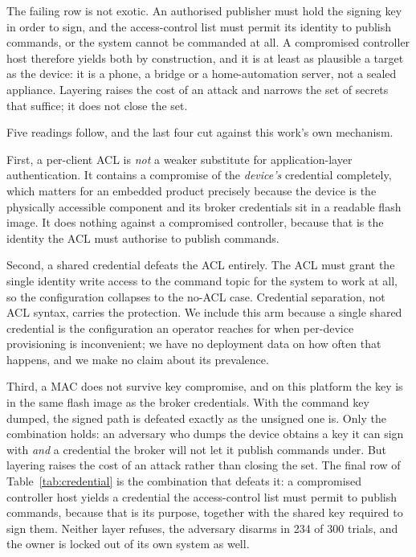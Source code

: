 The failing row is not exotic. An authorised publisher must hold the signing key in order to
sign, and the access-control list must permit its identity to publish commands, or the system
cannot be commanded at all. A compromised controller host therefore yields both by
construction, and it is at least as plausible a target as the device: it is a phone, a bridge
or a home-automation server, not a sealed appliance. Layering raises the cost of an attack and
narrows the set of secrets that suffice; it does not close the set.

Five readings follow, and the last four cut against this work's own mechanism.

First, a per-client ACL is \emph{not} a weaker substitute for application-layer authentication.
It contains a compromise of the \emph{device's} credential completely, which matters for an
embedded product precisely because the device is the physically accessible component and its
broker credentials sit in a readable flash image. It does nothing against a compromised
controller, because that is the identity the ACL must authorise to publish commands.

Second, a shared credential defeats the ACL entirely. The ACL must grant the single identity
write access to the command topic for the system to work at all, so the configuration collapses
to the no-ACL case. Credential separation, not ACL syntax, carries the protection. We
include this arm because a single shared credential is the configuration an operator reaches
for when per-device provisioning is inconvenient; we have no deployment data on how often that
happens, and we make no claim about its prevalence.

Third, a MAC does not survive key compromise, and on this platform the key is in the same flash
image as the broker credentials. With the command key dumped, the signed path is defeated
exactly as the unsigned one is. Only the combination holds: an adversary who dumps the device
obtains a key it can sign with \emph{and} a credential the broker will not let it publish
commands under. But layering raises the cost of an attack rather than closing the set. The
final row of Table~\ref{tab:credential} is the combination that defeats it: a compromised
controller host yields a credential the access-control list must permit to publish commands,
because that is its purpose, together with the shared key required to sign them. Neither layer
refuses, the adversary disarms in 234 of 300 trials, and the owner is locked out of its own
system as well.

